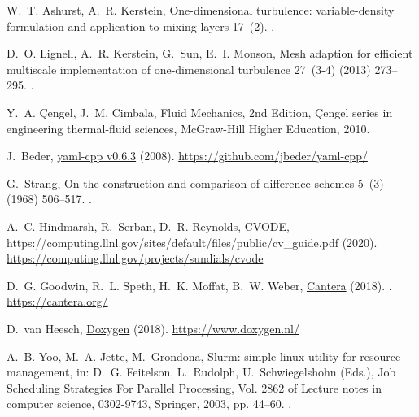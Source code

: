 \documentclass[preprint,12pt, a4paper]{elsarticle}
\begin{document}
\begin{thebibliography}{10}
W.~T. Ashurst, A.~R. Kerstein, One-dimensional turbulence: variable-density
  formulation and application to mixing layers 17~(2).
\newblock \href {http://dx.doi.org/10.1063/1.1847413}
  {}.

D.~O. Lignell, A.~R. Kerstein, G.~Sun, E.~I. Monson, Mesh adaption for
  efficient multiscale implementation of one-dimensional turbulence 27~(3-4)
  (2013) 273--295.
\newblock \href {http://dx.doi.org/10.1007/s00162-012-0267-9}
  {}.

Y.~A. {\c{C}}engel, J.~M. Cimbala, Fluid Mechanics, 2nd Edition, {\c{C}}engel
  series in engineering thermal-fluid sciences, {McGraw-Hill Higher Education},
  2010.

J.~Beder, \href{https://github.com/jbeder/yaml-cpp/}{yaml-cpp v0.6.3} (2008).
\newline\urlprefix\url{https://github.com/jbeder/yaml-cpp/}

G.~Strang, On the construction and comparison of difference schemes 5~(3)
  (1968) 506--517.
\newblock \href {http://dx.doi.org/10.1137/0705041}
  {}.

A.~C. Hindmarsh, R.~Serban, D.~R. Reynolds,
  \href{https://computing.llnl.gov/projects/sundials/cvode}{{CVODE}},
  https://computing.llnl.gov/sites/default/files/public/cv{\_}guide.pdf (2020).
\newline\urlprefix\url{https://computing.llnl.gov/projects/sundials/cvode}

D.~G. Goodwin, R.~L. Speth, H.~K. Moffat, B.~W. Weber,
  \href{https://cantera.org/}{Cantera} (2018).
\newblock \href {http://dx.doi.org/10.5281/zenodo.1174508}
  {}.
\newline\urlprefix\url{https://cantera.org/}

D.~{van Heesch}, \href{https://www.doxygen.nl/}{Doxygen} (2018).
\newline\urlprefix\url{https://www.doxygen.nl/}

A.~B. Yoo, M.~A. Jette, M.~Grondona, Slurm: simple linux utility for resource
  management, in: D.~G. Feitelson, L.~Rudolph, U.~Schwiegelshohn (Eds.), Job
  Scheduling Strategies For Parallel Processing, Vol. 2862 of Lecture notes in
  computer science, 0302-9743, Springer, 2003, pp. 44--60.
\newblock \href {http://dx.doi.org/10.1007/10968987-3}
  {}.


\end{thebibliography}
\end{document}
